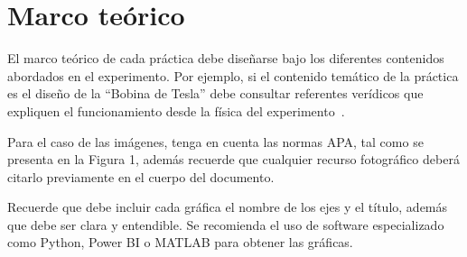 \section{Marco teórico}

El marco teórico de cada práctica debe diseñarse bajo los diferentes contenidos abordados 
en el experimento. Por ejemplo, si el contenido temático de la práctica es el diseño de 
la ``Bobina de Tesla'' debe consultar referentes verídicos que expliquen el funcionamiento 
desde la física del experimento~\parencite{cervantes1999}.

Para el caso de las imágenes, tenga en cuenta las normas APA, tal como se presenta
en la Figura 1, además recuerde que cualquier recurso fotográfico deberá citarlo previamente 
en el cuerpo del documento.

Recuerde que debe incluir cada gráfica el nombre de los ejes y el título, además que
debe ser clara y entendible. Se recomienda el uso de software especializado como
Python, Power BI o MATLAB para obtener las gráficas.

